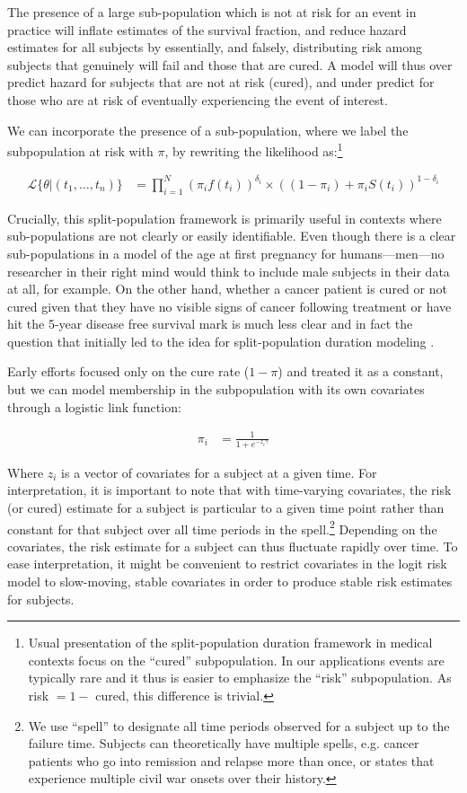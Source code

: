 \documentclass[letter]{article}
\begin{document}
The presence of a large sub-population which is not at risk for an event in practice will inflate estimates of the survival fraction, and reduce hazard estimates for all subjects by essentially, and falsely, distributing risk among subjects that genuinely will fail and those that are cured. A model will thus over predict hazard for subjects that are not at risk (cured), and under predict for those who are at risk of eventually experiencing the event of interest. 

We can incorporate the presence of a sub-population, where we label the subpopulation at risk with $\pi$, by rewriting the likelihood as:\footnote{Usual presentation of the split-population duration framework in medical contexts focus on the ``cured'' subpopulation. In our applications events are typically rare and it thus is easier to emphasize the ``risk'' subpopulation. As risk $= 1 - $ cured, this difference is trivial.}

\begin{align}
\mathcal{L}\{\theta|(t_{1}, \dots, t_{n})\} &= \prod_{i=1}^{N} \left(\pi_i f(t_i)\right)^{\delta_i} \times  \left((1-\pi_i) + \pi_i S(t_i)\right)^{1-\delta_i}
\end{align}

Crucially, this split-population framework is primarily useful in contexts where sub-populations are not clearly or easily identifiable. Even though there is a clear sub-populations in a model of the age at first pregnancy for humans---men---no researcher in their right mind would think to include male subjects in their data at all, for example. On the other hand, whether a cancer patient is cured or not cured given that they have no visible signs of cancer following treatment or have hit the 5-year disease free survival mark is much less clear and in fact the question that initially led to the idea for split-population duration modeling \citep{boag1949maximum, berkson1952survival}.

Early efforts focused only on the cure rate ($1 - \pi$) and treated it as a constant, but we can model membership in the subpopulation with its own covariates through a logistic link function:

\begin{align}
\pi_i &= \frac{1}{1 + e^{-z_i \gamma}}
\end{align}

Where $z_i$ is a vector of covariates for a subject at a given time. For interpretation, it is important to note that with time-varying covariates, the risk (or cured) estimate for a subject is particular to a given time point rather than constant for that subject over all time periods in the spell.\footnote{We use ``spell'' to designate all time periods observed for a subject up to the failure time. Subjects can theoretically have multiple spells, e.g. cancer patients who go into remission and relapse more than once, or states that experience multiple civil war onsets over their history.} Depending on the covariates, the risk estimate for a subject can thus fluctuate rapidly over time. To ease interpretation, it might be convenient to restrict covariates in the logit risk model to slow-moving, stable covariates in order to produce stable risk estimates for subjects. 
\end{document}
